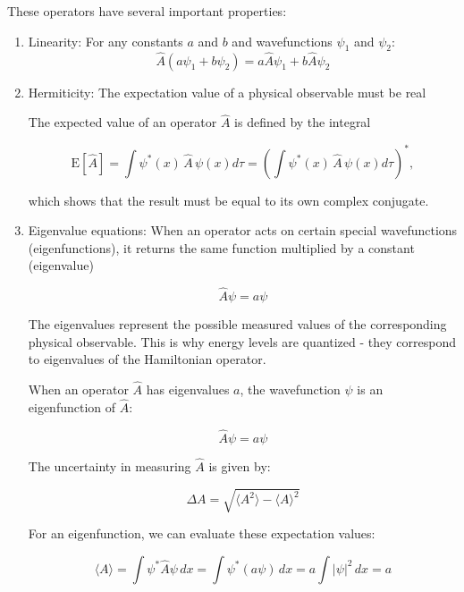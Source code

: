 \documentclass[
  a4paper,
]{book}
\begin{document}
These operators have several important properties:

\begin{enumerate}
\def\labelenumi{\arabic{enumi}.}
\item
  Linearity: For any constants \(a\) and \(b\) and wavefunctions
  \(\psi_1\) and \(\psi_2\):
  \[\hat{A}(a\psi_1 + b\psi_2) = a\hat{A}\psi_1 + b\hat{A}\psi_2\]
\item
  Hermiticity: The expectation value of a physical observable must be
  real

  The expected value of an operator \(\hat{A}\) is defined by the
  integral

  \[\mathrm{E}[\hat{A}] = \int \psi^*(x)\,\hat{A}\,\psi(x)d\tau = \left(\int \psi^*(x)\,\hat{A}\,\psi(x)d\tau\right)^*,\]

  which shows that the result must be equal to its own complex
  conjugate.
\item
  Eigenvalue equations: When an operator acts on certain special
  wavefunctions (eigenfunctions), it returns the same function
  multiplied by a constant (eigenvalue)

  \[\hat{A}\psi = a\psi\]

  The eigenvalues represent the possible measured values of the
  corresponding physical observable. This is why energy levels are
  quantized - they correspond to eigenvalues of the Hamiltonian
  operator.

  \begin{tcolorbox}[enhanced jigsaw, coltitle=black, title=\textcolor{quarto-callout-note-color}{\faInfo}\hspace{0.5em}{Uncertainty of an observable in an eigenstate}, colframe=quarto-callout-note-color-frame, toprule=.15mm, opacitybacktitle=0.6, left=2mm, opacityback=0, breakable, toptitle=1mm, bottomtitle=1mm, leftrule=.75mm, arc=.35mm, titlerule=0mm, colbacktitle=quarto-callout-note-color!10!white, rightrule=.15mm, bottomrule=.15mm, colback=white]

  When an operator \(\hat{A}\) has eigenvalues \(a\), the wavefunction
  \(\psi\) is an eigenfunction of \(\hat{A}\):

  \[\hat{A}\psi = a\psi\]

  The uncertainty in measuring \(\hat{A}\) is given by:

  \[\Delta A = \sqrt{\langle A^2 \rangle - \langle A \rangle^2}\]

  For an eigenfunction, we can evaluate these expectation values:

  \[\langle A \rangle = \int \psi^* \hat{A} \psi \, dx = \int \psi^* (a\psi) \, dx = a \int |\psi|^2 \, dx = a\]


\end{tcolorbox}
\end{enumerate}
\end{document}
